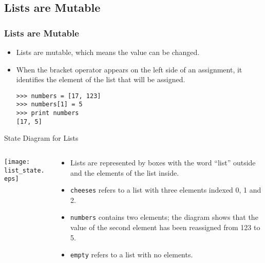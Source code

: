 \documentclass{beamer}
\begin{document}
\subsection[Lists are Mutable]{Lists are Mutable}
\begin{frame}[fragile]
\frametitle{Lists are Mutable}
\begin{itemize}
\item Lists are \alert{mutable}, which means the value can be changed.   
\item When the bracket operator appears
on the left side of an assignment, it identifies the element of the
list that will be assigned.
\small
\begin{verbatim}
>>> numbers = [17, 123]
>>> numbers[1] = 5
>>> print numbers
[17, 5]
\end{verbatim}
\normalsize
\end{itemize}

\end{frame}
\begin{frame}{State Diagram for Lists}
\begin{columns}
\begin{column}{0.4\textwidth}
\centerline{\texttt{[image: list\_state.eps]}}
\end{column}
\begin{column}{0.6\textwidth}
\begin{itemize}
\item Lists are represented by boxes with the word ``list'' outside
and the elements of the list inside.  
\item {\tt cheeses} refers to
a list with three elements indexed 0, 1 and 2.
\item {\tt numbers} contains two elements; the diagram shows that the
value of the second element has been reassigned from 123 to 5.
\item {\tt empty} refers to a list with no elements.
\end{itemize}
\end{column}
\end{columns}\end{frame}
\end{document}
